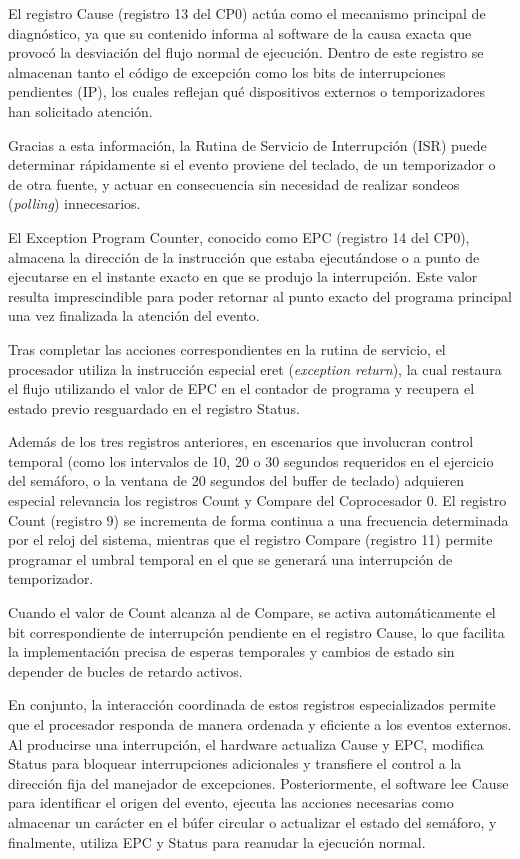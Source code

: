 \documentclass[12pt, letterpaper]{article}
\begin{document}
El registro Cause (registro 13 del CP0) actúa como el mecanismo principal de diagnóstico, ya que su contenido informa al software de la causa exacta que provocó la desviación del flujo normal de ejecución. Dentro de este registro se almacenan tanto el código de excepción como los bits de interrupciones pendientes (IP), los cuales reflejan qué dispositivos externos o temporizadores han solicitado atención. 

Gracias a esta información, la Rutina de Servicio de Interrupción (ISR) puede determinar rápidamente si el evento proviene del teclado, de un temporizador o de otra fuente, y actuar en consecuencia sin necesidad de realizar sondeos (\textit{polling}) innecesarios.

El Exception Program Counter, conocido como EPC (registro 14 del CP0), almacena la dirección de la instrucción que estaba ejecutándose o a punto de ejecutarse en el instante exacto en que se produjo la interrupción. Este valor resulta imprescindible para poder retornar al punto exacto del programa principal una vez finalizada la atención del evento. 

Tras completar las acciones correspondientes en la rutina de servicio, el procesador utiliza la instrucción especial eret (\textit{exception return}), la cual restaura el flujo utilizando el valor de EPC en el contador de programa y recupera el estado previo resguardado en el registro Status.

Además de los tres registros anteriores, en escenarios que involucran control temporal (como los intervalos de 10, 20 o 30 segundos requeridos en el ejercicio del semáforo, o la ventana de 20 segundos del buffer de teclado) adquieren especial relevancia los registros Count y Compare del Coprocesador 0. El registro Count (registro 9) se incrementa de forma continua a una frecuencia determinada por el reloj del sistema, mientras que el registro Compare (registro 11) permite programar el umbral temporal en el que se generará una interrupción de temporizador.

Cuando el valor de Count alcanza al de Compare, se activa automáticamente el bit correspondiente de interrupción pendiente en el registro Cause, lo que facilita la implementación precisa de esperas temporales y cambios de estado sin depender de bucles de retardo activos.

En conjunto, la interacción coordinada de estos registros especializados permite que el procesador responda de manera ordenada y eficiente a los eventos externos. Al producirse una interrupción, el hardware actualiza Cause y EPC, modifica Status para bloquear interrupciones adicionales y transfiere el control a la dirección fija del manejador de excepciones. Posteriormente, el software lee Cause para identificar el origen del evento, ejecuta las acciones necesarias como almacenar un carácter en el búfer circular o actualizar el estado del semáforo, y finalmente, utiliza EPC y Status para reanudar la ejecución normal.\newpage
\end{document}
